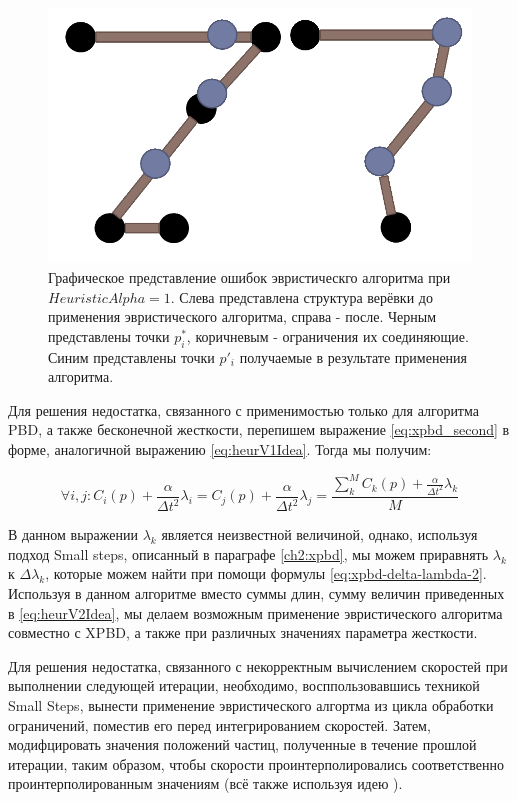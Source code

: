 	\begin{figure}[ht!] 
		\center
		\includegraphics [scale=0.3] {my_folder/images//heuristicSchemaFail}
		\caption{Графическое представление ошибок эвристическго алгоритма при $HeuristicAlpha = 1$. Слева представлена структура верёвки до применения эвристического алгоритма, справа - после. Черным представлены точки $p^*_i$, коричневым - ограничения их соединяющие. Синим представлены точки $p'_i$ получаемые в результате применения алгоритма.}
		\label{fig:heuristicSchemaFail}  
	\end{figure}	
	\FloatBarrier 
	
	Для решения недостатка, связанного с применимостью только для алгоритма PBD, а также бесконечной жесткости, перепишем выражение \ref{eq:xpbd_second} в форме, аналогичной выражению \ref{eq:heurV1Idea}. Тогда мы получим:
	
	\begin{equation} \label{eq:heurV2Idea}
		\forall i,j : C_i(p) + \frac{\alpha}{\Delta t^2}\lambda_i = C_j(p) + \frac{\alpha}{\Delta t^2}\lambda_j = \frac{\sum_k^M C_k(p) + \frac{\alpha}{\Delta t^2}\lambda_k}{M}
	\end{equation}
	
	В данном выражении $\lambda_k$ является неизвестной величиной, однако, используя подход Small steps, описанный в параграфе \ref{ch2:xpbd}, мы можем приравнять $\lambda_k$ к $\Delta \lambda_k$, которые можем найти при помощи формулы \ref{eq:xpbd-delta-lambda-2}. Используя в данном алгоритме вместо суммы длин, сумму величин приведенных в \ref{eq:heurV2Idea}, мы делаем возможным применение эвристического алгоритма совместно с XPBD, а также при различных значениях параметра жесткости.
	
	Для решения недостатка, связанного с некорректным вычислением скоростей при выполнении следующей итерации,  необходимо, восппользовавшись техникой Small Steps, вынести применение эвристического алгортма из цикла обработки ограничений, поместив его перед интегрированием скоростей. Затем, модифцировать значения положений частиц, полученные в течение прошлой итерации, таким образом, чтобы скорости проинтерполировались соответственно проинтерполированным значениям (всё также используя идею ).
	
